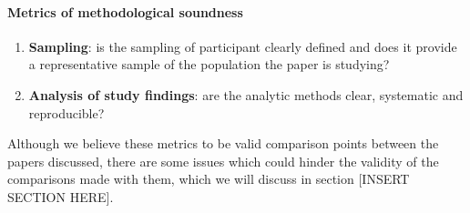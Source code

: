 \paragraph{Metrics of methodological soundness}
\begin{enumerate}
    \item \textbf{Sampling}: is the sampling of participant clearly defined and does it provide a representative sample of the population the paper is studying?
    \item \textbf{Analysis of study findings}: are the analytic methods clear, systematic and reproducible?
\end{enumerate}


\noindent Although we believe these metrics to be valid comparison points between the papers discussed, there are some issues which could hinder the validity of the comparisons made with them, which we will discuss in section [INSERT SECTION HERE].